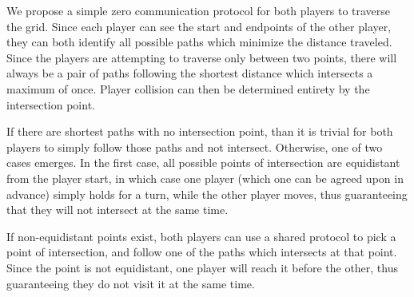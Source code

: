 \documentclass[12pt,letterpaper]{article}
\begin{document}
We propose a simple zero communication protocol for both players to
traverse the grid. Since each player can see the start and endpoints of
the other player, they can both identify all possible paths which
minimize the distance traveled. Since the players are attempting to
traverse only between two points, there will always be a pair of paths
following the shortest distance which intersects a maximum of once.
Player collision can then be determined entirety by the intersection
point. 

If there are shortest paths with no intersection point, than it
is trivial for both players to simply follow those paths and not
intersect. Otherwise, one of two cases emerges. In the first case, all
possible points of intersection are equidistant from the player start,
in which case one player (which one can be agreed upon in advance)
simply holds for a turn, while the other player moves, thus
guaranteeing that they will not intersect at the same time. 

If non-equidistant points exist, both players can use a shared
protocol to pick a point of intersection, and follow one of the paths
which intersects at that point. Since the point is not equidistant, one
player will reach it before the other, thus guaranteeing they do not
visit it at the same time.
\end{document}
